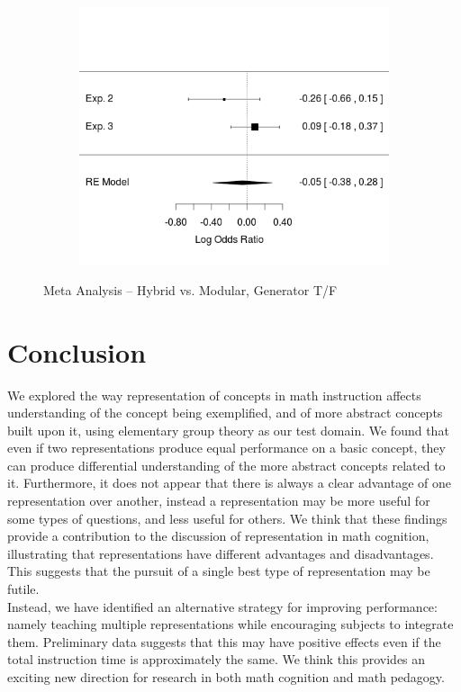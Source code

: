\documentclass[11pt]{article}
\begin{document}
\begin{figure}[H]
\centering
\begin{subfigure}[c]{0.4\textwidth}
\centering
\includegraphics[width=\textwidth]{figures/meta/h_gen_TF_n.png}
\end{subfigure}
\caption{Meta Analysis -- Hybrid vs. Modular, Generator T/F}
\label{meta_genTF_h}
\end{figure}\noindent 
\section{Conclusion}
We explored the way representation of concepts in math instruction affects understanding of the concept being exemplified, and of more abstract concepts built upon it, using elementary group theory as our test domain. We found that even if two representations produce equal performance on a basic concept, they can produce differential understanding of the more abstract concepts related to it. Furthermore, it does not appear that there is always a clear advantage of one representation over another, instead a representation may be more useful for some types of questions, and less useful for others. We think that these findings provide a contribution to the discussion of representation in math cognition, illustrating that representations have different advantages and disadvantages. This suggests that the pursuit of a single best type of representation may be futile. \\[11pt]
Instead, we have identified an alternative strategy for improving performance: namely teaching multiple representations while encouraging subjects to integrate them. Preliminary data suggests that this may have positive effects even if the total instruction time is approximately the same. We think this provides an exciting new direction for research in both math cognition and math pedagogy. 
 
\end{document}
